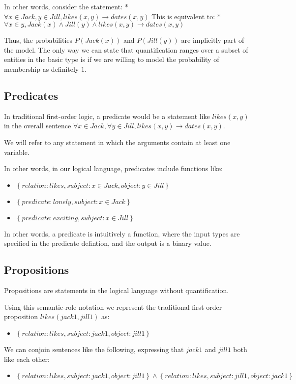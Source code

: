 \documentclass[12pt]{article}
\begin{document}
In other words, consider the statement:
* $\forall x \in Jack, y \in Jill, likes(x, y) \rightarrow dates(x, y)$
This is equivalent to:
* $\forall x \in  y, Jack(x) \wedge Jill(y) \wedge likes(x, y) \rightarrow dates(x, y)$

Thus, the probabilities $P(Jack(x))$ and $P(Jill(y))$ are implicitly part of the model.
The only way we can state that quantification ranges over a subset of entities in the basic type is if we are willing to model the probability of membership as definitely $1$.

\subsection{Predicates}
In traditional first-order logic, a predicate would be a statement like $likes(x, y)$ in the overall sentence $\forall x\in Jack, \forall y \in Jill, likes(x,y) \rightarrow dates(x, y)$.

We will refer to any statement in which the arguments contain at least one variable.

In other words, in our logical language, predicates include functions like:
\begin{itemize}
\item $\left\{relation:likes, subject:{x \in Jack}, object:{y \in Jill} \right\}$
\item $\left\{predicate:lonely, subject:{x \in Jack} \right\}$
\item $\left\{predicate:exciting, subject:{x \in Jill} \right\}$
\end{itemize}

In other words, a predicate is intuitively a function, where the input types are specified in the predicate defintion, and the output is a binary value.


\subsection{Propositions}
Propositions are statements in the logical language without quantification.

Using this semantic-role notation we represent the traditional first order proposition $likes(jack1, jill1)$ as:
\begin{itemize}
    \item $\left\{relation:likes, subject:jack1, object:jill1 \right\}$
\end{itemize}

We can conjoin sentences like the following, expressing that $jack1$ and $jill1$ both like each other:
\begin{itemize}
    \item $\left\{relation:likes, subject:jack1, object:jill1 \right\} \wedge \left\{relation:likes, subject:jill1, object:jack1 \right\}$
\end{itemize}
\end{document}
